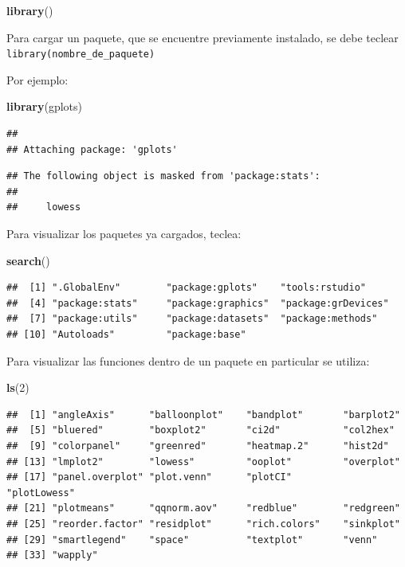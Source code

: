 \documentclass[
]{book}
\newenvironment{Shaded}{\begin{snugshade}}{\end{snugshade}}
\newcommand{\DecValTok}[1]{\textcolor[rgb]{0.00,0.00,0.81}{#1}}
\newcommand{\FunctionTok}[1]{\textcolor[rgb]{0.13,0.29,0.53}{\textbf{#1}}}
\newcommand{\NormalTok}[1]{#1}
\begin{document}
\begin{Shaded}
\begin{Highlighting}[]
\FunctionTok{library}\NormalTok{()}
\end{Highlighting}
\end{Shaded}

Para cargar un paquete, que se encuentre previamente instalado, se debe teclear
\texttt{library(nombre\_de\_paquete)}

Por ejemplo:

\begin{Shaded}
\begin{Highlighting}[]
\FunctionTok{library}\NormalTok{(gplots)  }
\end{Highlighting}
\end{Shaded}

\begin{verbatim}
## 
## Attaching package: 'gplots'
\end{verbatim}

\begin{verbatim}
## The following object is masked from 'package:stats':
## 
##     lowess
\end{verbatim}

Para visualizar los paquetes ya cargados, teclea:

\begin{Shaded}
\begin{Highlighting}[]
\FunctionTok{search}\NormalTok{()}
\end{Highlighting}
\end{Shaded}

\begin{verbatim}
##  [1] ".GlobalEnv"        "package:gplots"    "tools:rstudio"    
##  [4] "package:stats"     "package:graphics"  "package:grDevices"
##  [7] "package:utils"     "package:datasets"  "package:methods"  
## [10] "Autoloads"         "package:base"
\end{verbatim}

Para visualizar las funciones dentro de un paquete en particular se utiliza:

\begin{Shaded}
\begin{Highlighting}[]
\FunctionTok{ls}\NormalTok{(}\DecValTok{2}\NormalTok{)}
\end{Highlighting}
\end{Shaded}

\begin{verbatim}
##  [1] "angleAxis"      "balloonplot"    "bandplot"       "barplot2"      
##  [5] "bluered"        "boxplot2"       "ci2d"           "col2hex"       
##  [9] "colorpanel"     "greenred"       "heatmap.2"      "hist2d"        
## [13] "lmplot2"        "lowess"         "ooplot"         "overplot"      
## [17] "panel.overplot" "plot.venn"      "plotCI"         "plotLowess"    
## [21] "plotmeans"      "qqnorm.aov"     "redblue"        "redgreen"      
## [25] "reorder.factor" "residplot"      "rich.colors"    "sinkplot"      
## [29] "smartlegend"    "space"          "textplot"       "venn"          
## [33] "wapply"
\end{verbatim}
\end{document}
